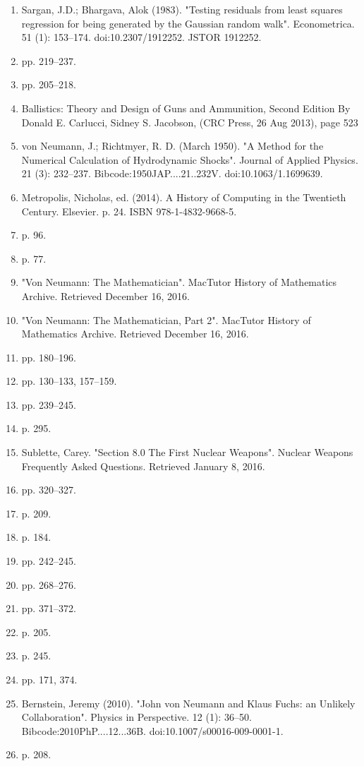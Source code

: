\begin{enumerate}
\item Sargan, J.D.; Bhargava, Alok (1983). "Testing residuals from least squares regression for being generated by the Gaussian random walk". Econometrica. 51 (1): 153–174. doi:10.2307/1912252. JSTOR 1912252.
\item  pp. 219–237.
\item  pp. 205–218.
\item Ballistics: Theory and Design of Guns and Ammunition, Second Edition By Donald E. Carlucci, Sidney S. Jacobson, (CRC Press, 26 Aug 2013), page 523
\item von Neumann, J.; Richtmyer, R. D. (March 1950). "A Method for the Numerical Calculation of Hydrodynamic Shocks". Journal of Applied Physics. 21 (3): 232–237. Bibcode:1950JAP....21..232V. doi:10.1063/1.1699639.
\item Metropolis, Nicholas, ed. (2014). A History of Computing in the Twentieth Century. Elsevier. p. 24. ISBN 978-1-4832-9668-5.
\item  p. 96.
\item  p. 77.
\item "Von Neumann: The Mathematician". MacTutor History of Mathematics Archive. Retrieved December 16, 2016.
\item "Von Neumann: The Mathematician, Part 2". MacTutor History of Mathematics Archive. Retrieved December 16, 2016.
\item  pp. 180–196.
\item  pp. 130–133, 157–159.
\item  pp. 239–245.
\item  p. 295.
\item Sublette, Carey. "Section 8.0 The First Nuclear Weapons". Nuclear Weapons Frequently Asked Questions. Retrieved January 8, 2016.
\item  pp. 320–327.
\item  p. 209.
\item  p. 184.
\item  pp. 242–245.
\item  pp. 268–276.
\item  pp. 371–372.
\item  p. 205.
\item  p. 245.
\item  pp. 171, 374.
\item Bernstein, Jeremy (2010). "John von Neumann and Klaus Fuchs: an Unlikely Collaboration". Physics in Perspective. 12 (1): 36–50. Bibcode:2010PhP....12...36B. doi:10.1007/s00016-009-0001-1.
\item  p. 208.

\end{enumerate}
